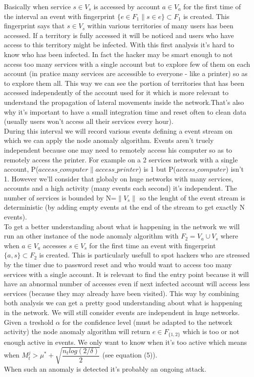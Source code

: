 \documentclass[11pt]{article}
\begin{document}
Basically when service $s\in V_s$ is accessed by account $a\in V_a$ for the first time of the interval an event with fingerprint $\{e\in F_1 \| s \in e\}\subset F_1$ is created. This fingerprint says that $s\in V_s$ within various territories of many users has been accessed. If a territory is fully accessed it will be noticed and users who have access to this territory might be infected. With this first analysis it's hard to know who has been infected. In fact the hacker may be smart enough to not access too many services with a single account but to explore few of them on each account (in pratice many services are accessible to everyone - like a printer) so as to explore them all. This way we can see the portion of territories that has been accessed independently of the account used for it which is more relevant to understand the propagation of lateral movements inside the network.That's also why it's important to have a small integration time and reset often to clean data (usually users won't access all their services every hour).\\
\indent During this interval we will record various events defining a event stream on which we can apply the node anomaly algorithm. Events aren't truely independent because one may need to remotely access his computer so as to remotely access the printer. For example on a 2 services network with a single account, P($access\_computer\|access\_printer$) is 1 but P($access\_computer$) isn't 1. However we'll consider that globaly on huge networks with many services, accounts and a high activity (many events each second) it's independent. The number of services is bounded by N=$\|V_s\|$ so the lenght of the event stream is deterministic (by adding empty events at the end of the stream to get exactly N events).\\
\indent To get a better understanding about what is happening in the network we will run an other instance of the node anomaly algorithm with $F_2 = V_a \cup V_s$ where when $a\in V_a$ accesses $s\in V_s$ for the first time an event with fingerprint $\{a,s\} \subset F_2$ is created. This is particularly usefull to spot hackers who are stressed by the timer due to password reset and who would want to access too many services with a single account. It is relevant to find the entry point because it will have an abnormal number of accesses even if next infected account will access less services (because they may already have been visited). This way by combining both analysis we can get a pretty good understanding about what is happening in the network. We will still consider events are independent in huge networks.\\
\indent Given a treshold $\alpha$ for the confidence level (must be adapted to the network activity) the node anomaly algorithm will return $e\in F_{\{1,2\}}$ which is too or not enough active in events. We only want to know when it's too active which means when $M_t^{j} > \mu^*+\sqrt{\dfrac{n_tlog(2/\delta)}{2}}$ (see \cite{node} equation (5)). \\
\indent When such an anomaly is detected it's probably an ongoing attack. 
\end{document}
